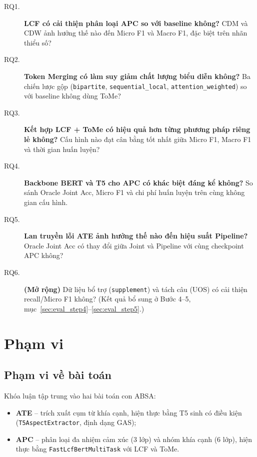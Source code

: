 \begin{description}
  \item[RQ1.] \textbf{LCF có cải thiện phân loại APC so với baseline không?}
        CDM và CDW ảnh hưởng thế nào đến Micro F1 và Macro F1, đặc biệt trên nhãn thiểu số?

  \item[RQ2.] \textbf{Token Merging có làm suy giảm chất lượng biểu diễn không?}
        Ba chiến lược gộp (\texttt{bipartite}, \texttt{sequential\_local},
        \texttt{attention\_weighted}) so với baseline không dùng ToMe?

  \item[RQ3.] \textbf{Kết hợp LCF + ToMe có hiệu quả hơn từng phương pháp riêng lẻ không?}
        Cấu hình nào đạt cân bằng tốt nhất giữa Micro F1, Macro F1 và thời gian huấn luyện?

  \item[RQ4.] \textbf{Backbone BERT và T5 cho APC có khác biệt đáng kể không?}
        So sánh Oracle Joint Acc, Micro F1 và chi phí huấn luyện trên cùng không gian cấu hình.

  \item[RQ5.] \textbf{Lan truyền lỗi ATE ảnh hưởng thế nào đến hiệu suất Pipeline?}
        Oracle Joint Acc có thay đổi giữa Joint và Pipeline với cùng checkpoint APC không?

  \item[RQ6.] \textbf{(Mở rộng)} Dữ liệu bổ trợ (\texttt{supplement}) và tách câu (UOS)
        có cải thiện recall/Micro F1 không? (Kết quả bổ sung ở Bước 4--5, mục~\ref{sec:eval_step4}--\ref{sec:eval_step5}.)
\end{description}

\section{Phạm vi}
\label{sec:gt_phamvi}

\subsection{Phạm vi về bài toán}

Khóa luận tập trung vào hai bài toán con ABSA:

\begin{itemize}
  \item \textbf{ATE} -- trích xuất cụm từ khía cạnh, hiện thực bằng T5 sinh có điều kiện
        (\texttt{T5AspectExtractor}, định dạng GAS);
  \item \textbf{APC} -- phân loại đa nhiệm cảm xúc (3 lớp) và nhóm khía cạnh (6 lớp),
        hiện thực bằng \texttt{FastLcfBertMultiTask} với LCF và ToMe.
\end{itemize}

